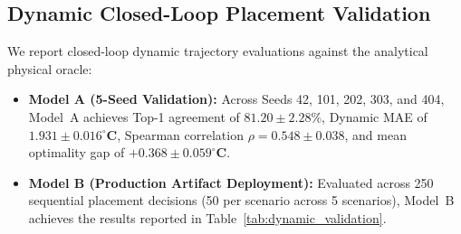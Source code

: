 \documentclass[conference,10pt]{IEEEtran}
\begin{document}
\subsection{Dynamic Closed-Loop Placement Validation}
We report closed-loop dynamic trajectory evaluations against the analytical physical oracle:
\begin{itemize}
    \item \textbf{Model A (5-Seed Validation):} Across Seeds 42, 101, 202, 303, and 404, Model~A achieves Top-1 agreement of $\mathbf{81.20 \pm 2.28\%}$, Dynamic MAE of $\mathbf{1.931 \pm 0.016^\circ\text{C}}$, Spearman correlation $\rho = \mathbf{0.548 \pm 0.038}$, and mean optimality gap of $\mathbf{+0.368 \pm 0.059^\circ\text{C}}$.
    \item \textbf{Model B (Production Artifact Deployment):} Evaluated across 250 sequential placement decisions (50 per scenario across 5 scenarios), Model~B achieves the results reported in Table~\ref{tab:dynamic_validation}.
\end{itemize}

\begin{table}[htbp]
\caption{Dynamic Closed-Loop Placement Quality Comparison (250 Decisions)}
\label{tab:dynamic_validation}
\centering
{}
\end{table}
\end{document}
